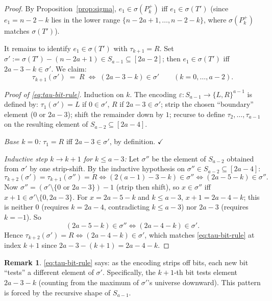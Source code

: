 \documentclass[11pt]{article}
\theoremstyle{definition}
\newtheorem{remark}[theorem]{Remark}
\begin{document}
\begin{proof}
By Proposition~\ref{prop:sigma}, $e_1\in\sigma(P_k^+)$ iff
$e_1\in\sigma(T')$ (since $e_1=n-2-k$ lies in the lower range
$\{n-2a+1,\ldots,n-2-k\}$, where $\sigma(P_k^+)$ matches $\sigma(T')$).

It remains to identify $e_1\in\sigma(T')$ with $\tau_{k+1}=R$.
Set $\sigma':=\sigma(T')-(n-2a+1)\in S_{a-1}\subseteq[2a-2]$;
then $e_1\in\sigma(T')$ iff $2a-3-k\in\sigma'$.  We claim:
\begin{equation}\label{eq:tau-bit-rule}
   \tau_{k+1}(\sigma')\;=\;R\;\Longleftrightarrow\;(2a-3-k)\in\sigma'
   \qquad(k=0,\ldots,a-2).
\end{equation}

\emph{Proof of \eqref{eq:tau-bit-rule}.}  Induction on $k$.
The encoding $\varepsilon:S_{a-1}\to\{L,R\}^{a-1}$ is defined by:
$\tau_1(\sigma')=L$ if $0\in\sigma'$, $R$ if $2a-3\in\sigma'$;
strip the chosen ``boundary'' element ($0$ or $2a-3$); shift the
remainder down by $1$; recurse to define $\tau_2,\ldots,\tau_{a-1}$
on the resulting element of $S_{a-2}\subseteq[2a-4]$.

\emph{Base $k=0$:}  $\tau_1=R$ iff $2a-3\in\sigma'$, by definition.
$\checkmark$

\emph{Inductive step $k\to k+1$ for $k\le a-3$:}  Let $\sigma''$ be
the element of $S_{a-2}$ obtained from $\sigma'$ by one strip-shift.
By the inductive hypothesis on $\sigma''\in S_{a-2}\subseteq[2a-4]$:
\[
   \tau_{k+2}(\sigma')=\tau_{k+1}(\sigma'')=R
   \iff (2(a-1)-3-k)\in\sigma''
   \iff (2a-5-k)\in\sigma''.
\]
Now $\sigma''=(\sigma'\setminus\{0\text{ or }2a-3\})-1$ (strip then
shift), so $x\in\sigma''$ iff $x+1\in\sigma'\setminus\{0,2a-3\}$.
For $x=2a-5-k$ and $k\le a-3$, $x+1=2a-4-k$; this is neither $0$
(requires $k=2a-4$, contradicting $k\le a-3$) nor $2a-3$ (requires
$k=-1$).  So
\[
   (2a-5-k)\in\sigma''\iff(2a-4-k)\in\sigma'.
\]
Hence $\tau_{k+2}(\sigma')=R\iff(2a-4-k)\in\sigma'$, which matches
\eqref{eq:tau-bit-rule} at index $k+1$ since $2a-3-(k+1)=2a-4-k$.
\end{proof}

\begin{remark}
\eqref{eq:tau-bit-rule} says: as the encoding strips off bits, each
new bit ``tests'' a different element of $\sigma'$.  Specifically,
the $k+1$-th bit tests element $2a-3-k$ (counting from the maximum
of $\sigma'$'s universe downward).  This pattern is forced by the
recursive shape of $S_{a-1}$.
\end{remark}
\end{document}
